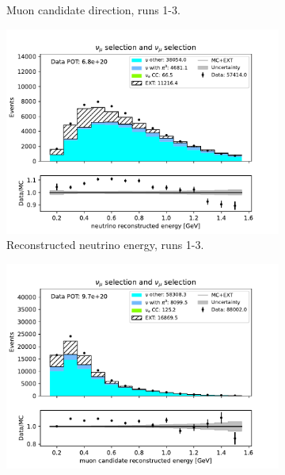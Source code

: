 \begin{figure}[H]
\begin{subfigure}{0.33\linewidth}
        \caption{Muon candidate direction, runs 1-3.}
    \end{subfigure}%
    \begin{subfigure}{0.33\linewidth}
        \captionsetup{width=0.7\linewidth}
        \includegraphics[width=\linewidth]{technote/Sidebands/Figures/NuMuSideband/muon_sideband_neutrino_energy_run123_NUMU_NUMU.pdf}
        \caption{Reconstructed neutrino energy, runs 1-3.}
    \end{subfigure}
    \begin{subfigure}{0.33\linewidth}
        \captionsetup{width=0.7\linewidth}
        \includegraphics[width=\linewidth]{technote/Sidebands/Figures/NuMuSideband/muon_sideband_muon_energy_run1234b4c4d_NUMU_NUMU.pdf}

\end{subfigure}
\end{figure}
